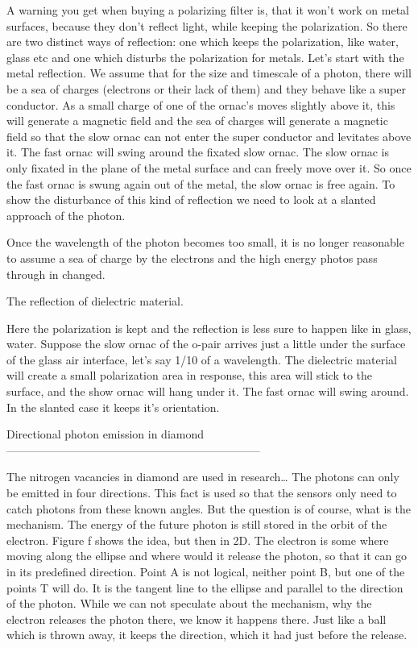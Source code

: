 A warning you get when buying a polarizing filter is, that it won't work on metal surfaces, because they don't reflect light, while keeping the polarization. So there are two distinct ways of reflection: one which keeps the polarization, like water, glass etc and one which disturbs the polarization for metals.
Let's start with the metal reflection. We assume that for the size and timescale of a photon, there will be a sea of charges (electrons or their lack of them) and they behave like a super conductor. As a small charge of one of the ornac’s moves slightly above it, this will generate a magnetic field and the sea of charges will generate a magnetic field so that the slow ornac can not enter the super conductor and levitates above it. The fast ornac will swing around the fixated slow ornac. The slow ornac is only fixated in the plane of the metal surface and can freely move over it. So once the fast ornac is swung again out of the metal, the slow ornac is free again.
To show the disturbance of this kind of reflection we need to look at a slanted approach of the photon.

Once the wavelength of the photon becomes too small, it is no longer reasonable to assume a sea of charge by the electrons and the high energy photos pass through in changed.

The reflection of dielectric material.

Here the polarization is kept and the reflection is less sure to happen like in glass, water. Suppose the slow ornac of the o-pair arrives just a little under the surface of the glass air interface, let's say 1/10 of a wavelength. The dielectric material will create a small polarization area in response, this area will stick to the surface, and the show ornac will hang under it. The fast ornac will swing around. In the slanted case it keeps it's orientation.




Directional photon emission in diamond
--------------------------------------------------------------------

The nitrogen vacancies in diamond are used in research…
The photons can only be emitted in four directions. This fact is used so that the sensors only need to catch photons from these known angles. But the question is of course, what is the mechanism. The energy of the future photon is still stored in the orbit of the electron. Figure f shows the idea, but then in 2D. The electron is some where moving along the ellipse and where would it release the photon, so that it can go in its predefined direction. Point A is not logical, neither point B, but one of the points T will do. It is the tangent line to the ellipse and parallel to the direction of the photon. While we can not speculate about the mechanism, why the electron releases the photon there, we know it happens there. Just like a ball which is thrown away, it keeps the direction, which it had just before the release. 

